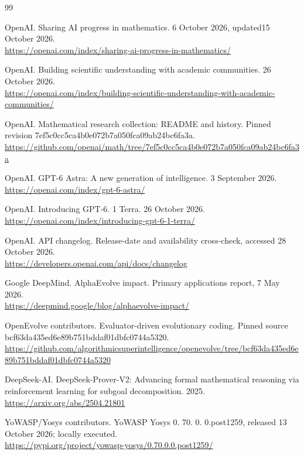 \begin{thebibliography}{99}

 OpenAI. Sharing AI progress in mathematics. 6 October 2026, updated15 October 2026.\\\url{https://openai.com/index/sharing-ai-progress-in-mathematics/}

 OpenAI. Building scientific understanding with academic communities. 26 October 2026.\\\url{https://openai.com/index/building-scientific-understanding-with-academic-communities/}

 OpenAI. Mathematical research collection: README and history. Pinned revision 7ef5c0cc5ca4b0e072b7a050fca09ab24bc6fa3a.\\\url{https://github.com/openai/math/tree/7ef5c0cc5ca4b0e072b7a050fca09ab24bc6fa3a}

 OpenAI. GPT-6 Astra: A new generation of intelligence. 3 September 2026.\\\url{https://openai.com/index/gpt-6-astra/}

 OpenAI. Introducing GPT-6. 1 Terra. 26 October 2026.\\\url{https://openai.com/index/introducing-gpt-6-1-terra/}

 OpenAI. API changelog. Release-date and availability cross-check, accessed 28 October 2026.\\\url{https://developers.openai.com/api/docs/changelog}

 Google DeepMind. AlphaEvolve impact. Primary applications report, 7 May 2026.\\\url{https://deepmind.google/blog/alphaevolve-impact/}

 OpenEvolve contributors. Evaluator-driven evolutionary coding. Pinned source bcf63da435ed6e89b751bddaf01dbfc0744a5320.\\\url{https://github.com/algorithmicsuperintelligence/openevolve/tree/bcf63da435ed6e89b751bddaf01dbfc0744a5320}

 DeepSeek-AI. DeepSeek-Prover-V2: Advancing formal mathematical reasoning via reinforcement learning for subgoal decomposition. 2025.\\\url{https://arxiv.org/abs/2504.21801}

 YoWASP/Yosys contributors. YoWASP Yosys 0. 70. 0. 0.post1259, released 13 October 2026; locally executed.\\\url{https://pypi.org/project/yowasp-yosys/0.70.0.0.post1259/}


\end{thebibliography}
